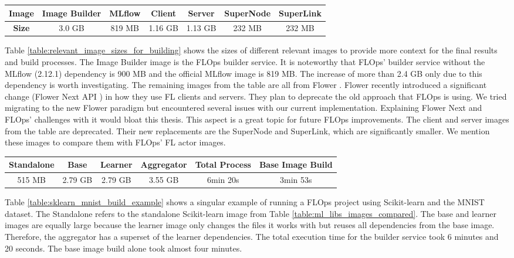 \begin{changemargin}{0cm}{0cm}
    \centering
    \begin{tabular}{|c||c|c|c|c|c|c|}
        \hline
            \textbf{Image} & Image Builder & MLflow & Client & Server & SuperNode & SuperLink \\
        \hline
            \textbf{Size} & 3.0 GB & 819 MB & 1.16 GB & 1.13 GB & 232 MB & 232 MB
        \\
        \hline
    \end{tabular}
    \label{table:relevant_image_sizes_for_building}
\end{changemargin}
Table \ref{table:relevant_image_sizes_for_building} shows the sizes of different relevant images to provide more context for the final results and build processes.
The Image Builder image is the FLOps builder service.
It is noteworthy that FLOps' builder service without the MLflow (2.12.1) dependency is 900 MB and the official MLflow image is 819 MB.
The increase of more than 2.4 GB only due to this dependency is worth investigating.
The remaining images from the table are all from Flower \cite{flower_images}.
Flower recently introduced a significant change (Flower Next API \cite{docs:flower_next}) in how they use FL clients and servers.
They plan to deprecate the old approach that FLOps is using.
We tried migrating to the new Flower paradigm but encountered several issues with our current implementation.
Explaining Flower Next and FLOps' challenges with it would bloat this thesis.
This aspect is a great topic for future FLOps improvements.
The client and server images from the table are deprecated.
Their new replacements are the SuperNode and SuperLink, which are significantly smaller.
We mention these images to compare them with FLOps' FL actor images.

\begin{changemargin}{0cm}{0cm}
    \centering
    \begin{tabular}{|c|c|c|c|c|c|}
        \hline
            \textbf{Standalone} & \textbf{Base} & \textbf{Learner} & \textbf{Aggregator} & \textbf{Total Process} & \textbf{Base Image Build} \\
        \hline
            515 MB & 2.79 GB & 2.79 GB & 3.55 GB & 6min 20s & 3min 53s
        \\
        \hline
    \end{tabular}
    \label{table:sklearn_mnist_build_example}
\end{changemargin}
Table \ref{table:sklearn_mnist_build_example} shows a singular example of running a FLOps project using Scikit-learn and the MNIST dataset.
The Standalone refers to the standalone Scikit-learn image from Table \ref{table:ml_libs_images_compared}.
The base and learner images are equally large because the learner image only changes the files it works with but reuses all dependencies from the base image.
Therefore, the aggregator has a superset of the learner dependencies.
The total execution time for the builder service took 6 minutes and 20 seconds.
The base image build alone took almost four minutes.

